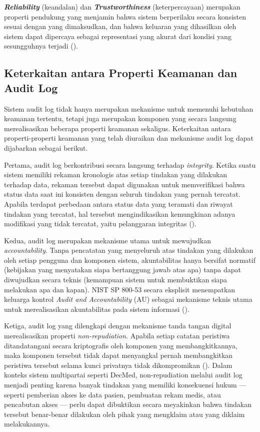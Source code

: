 \textbf{\textit{Reliability}} (keandalan) dan
\textbf{\textit{Trustworthiness}} (keterpercayaan) merupakan properti
pendukung yang menjamin bahwa sistem berperilaku secara konsisten
sesuai dengan yang dimaksudkan, dan bahwa keluaran yang dihasilkan
oleh sistem dapat dipercaya sebagai representasi yang akurat dari
kondisi yang sesungguhnya terjadi (\cite{iso27789_2021}).

\subsection{Keterkaitan antara Properti Keamanan dan Audit Log}
\label{subsec:keterkaitan-properti-audit-log}

Sistem audit log tidak hanya merupakan mekanisme untuk memenuhi
kebutuhan keamanan tertentu, tetapi juga merupakan komponen yang
secara langsung merealisasikan beberapa properti keamanan sekaligus.
Keterkaitan antara properti-properti keamanan yang telah diuraikan
dan mekanisme audit log dapat dijabarkan sebagai berikut.

Pertama, audit log berkontribusi secara langsung terhadap
\textit{integrity}. Ketika suatu sistem memiliki rekaman kronologis
atas setiap tindakan yang dilakukan terhadap data, rekaman tersebut
dapat digunakan untuk memverifikasi bahwa status data saat ini
konsisten dengan seluruh tindakan yang pernah tercatat. Apabila
terdapat perbedaan antara status data yang teramati dan riwayat
tindakan yang tercatat, hal tersebut mengindikasikan kemungkinan
adanya modifikasi yang tidak tercatat, yaitu pelanggaran integritas
(\cite{iso27789_2021}).

Kedua, audit log merupakan mekanisme utama untuk mewujudkan
\textit{accountability}. Tanpa pencatatan yang menyeluruh atas
tindakan yang dilakukan oleh setiap pengguna dan komponen sistem,
akuntabilitas hanya bersifat normatif (kebijakan yang menyatakan
siapa bertanggung jawab atas apa) tanpa dapat diwujudkan secara
teknis (kemampuan sistem untuk membuktikan siapa melakukan apa dan
kapan). NIST SP 800-53 secara eksplisit menempatkan keluarga kontrol
\textit{Audit and Accountability} (AU) sebagai mekanisme teknis utama
untuk merealisasikan akuntabilitas pada sistem informasi
(\cite{nist80053r5}).

Ketiga, audit log yang dilengkapi dengan mekanisme tanda tangan
digital merealisasikan properti \textit{non-repudiation}. Apabila
setiap catatan peristiwa ditandatangani secara kriptografis oleh
komponen yang membangkitkannya, maka komponen tersebut tidak dapat
menyangkal pernah membangkitkan peristiwa tersebut selama kunci
privatnya tidak dikompromikan (\cite{shostack2014}). Dalam konteks
sistem multipartai seperti DecMed, non-repudiation melalui audit log
menjadi penting karena banyak tindakan yang memiliki konsekuensi
hukum --- seperti pemberian akses ke data pasien, pembuatan rekam
medis, atau pencabutan akses --- perlu dapat dibuktikan secara
meyakinkan bahwa tindakan tersebut benar-benar dilakukan oleh pihak
yang mengklaim atau yang diklaim melakukannya.

